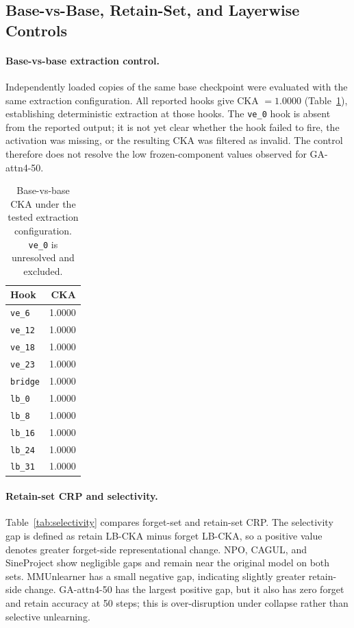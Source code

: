 \documentclass[letterpaper]{article}
\begin{document}
\subsection{Base-vs-Base, Retain-Set, and Layerwise Controls}
\label{app:e7controls}

\paragraph{Base-vs-base extraction control.}
Independently loaded copies of the same base checkpoint were evaluated with
the same extraction configuration. All reported hooks give CKA $=1.0000$
(Table~\ref{tab:base_vs_base}), establishing deterministic extraction at
those hooks. The \texttt{ve\_0} hook is absent from the reported output; it is
not yet clear whether the hook failed to fire, the activation was missing, or
the resulting CKA was filtered as invalid. The control therefore does not
resolve the low frozen-component values observed for GA-attn4-50.

\begin{table}[h]
\centering
\caption{Base-vs-base CKA under the tested extraction configuration.
\texttt{ve\_0} is unresolved and excluded.}
\label{tab:base_vs_base}
\setlength{\tabcolsep}{7pt}
\scriptsize
\begin{tabular}{lr}
\toprule
\textbf{Hook} & \textbf{CKA} \\
\midrule
\texttt{ve\_6}  & 1.0000 \\
\texttt{ve\_12} & 1.0000 \\
\texttt{ve\_18} & 1.0000 \\
\texttt{ve\_23} & 1.0000 \\
\texttt{bridge} & 1.0000 \\
\texttt{lb\_0}  & 1.0000 \\
\texttt{lb\_8}  & 1.0000 \\
\texttt{lb\_16} & 1.0000 \\
\texttt{lb\_24} & 1.0000 \\
\texttt{lb\_31} & 1.0000 \\
\bottomrule
\end{tabular}
\end{table}

\paragraph{Retain-set CRP and selectivity.}
Table~\ref{tab:selectivity} compares forget-set and retain-set CRP. The
selectivity gap is defined as retain LB-CKA minus forget LB-CKA, so a positive
value denotes greater forget-side representational change. NPO, CAGUL, and
SineProject show negligible gaps and remain near the original model on both
sets. MMUnlearner has a small negative gap, indicating slightly greater
retain-side change. GA-attn4-50 has the largest positive gap, but it also has
zero forget and retain accuracy at 50 steps; this is over-disruption under collapse rather than selective unlearning.
\end{document}
